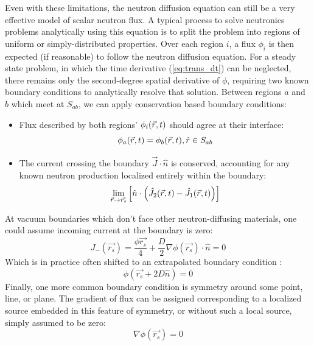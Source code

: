 \documentclass[12pt]{article}
\begin{document}
Even with these limitations, the neutron diffusion equation can still be a very effective model of scalar neutron flux.
A typical process to solve neutronics problems analytically using this equation is to split the problem into regions of uniform or simply-distributed properties.
Over each region $i$, a flux $\phi_i$ is then expected (if reasonable) to follow the neutron diffusion equation.
For a steady state problem, in which the time derivative (\ref{eq:trans_dt}) can be neglected, there remains only the second-degree spatial derivative of $\phi$, requiring two known boundary conditions to analytically resolve that solution.
Between regions $a$ and $b$ which meet at $S_{ab}$, we can apply conservation based boundary conditions:
\begin{itemize}
    \item Flux described by both regions' $\phi_i(\vec{r}, t)$ should agree at their interface: 
    \begin{equation}
        \phi_a(\vec{r}, t)=\phi_b(\vec{r}, t),{\hat{r}\in S_{ab}}
    \end{equation}
    \item The current crossing the boundary $\vec{J}\cdot\hat{n}$ is conserved, accounting for any known neutron production localized entirely within the boundary: 
    \begin{equation}
        \lim_{\vec{r}\rightarrow\vec{r_s}}\left[\hat{n}\cdot\left(\hat{J_2}(\vec{r}, t)-\hat{J_1}(\vec{r}, t)\right)\right]
    \end{equation}
\end{itemize}
At vacuum boundaries which don't face other neutron-diffusing materials, one could assume incoming current at the boundary is zero:
\begin{equation}
    J_-(\vec{r_s})=\frac{\phi\vec{r_s}}{4}+\frac{D}{2}\nabla\phi(\vec{r_s})\cdot\hat{n}=0
\end{equation}
Which is in practice often shifted to an extrapolated boundary condition \cite{novak_lecture9_2026}:
\begin{equation}
    \phi(\vec{r_s}+2D\hat{n})=0
\end{equation}
Finally, one more common boundary condition is symmetry around some point, line, or plane.
The gradient of flux can be assigned corresponding to a localized source embedded in this feature of symmetry, or without such a local source, simply assumed to be zero:
\begin{equation}
    \nabla\phi(\vec{r_s})=0
\end{equation}
\\
\end{document}
